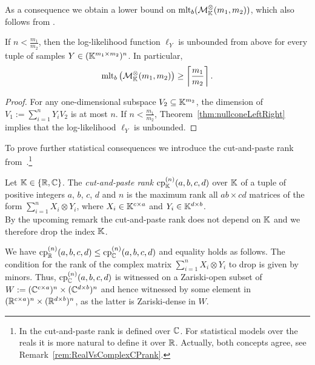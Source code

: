 As a consequence we obtain a lower bound on $\operatorname{mlt}_b ( \mathcal{M}^{\otimes}_{\mathbb{K}}(m_1,m_2) )$, which also follows from \cite[Lemma 1.2]{DrtonKurikiHoff}. 

\begin{cor}
	\label{cor:knownMLEbound}
	If $n < \frac{m_1}{m_2}$, then the log-likelihood function $\ell_Y$ is unbounded from above for every tuple of samples $Y \in (\mathbb K^{m_1 \times m_2})^n$.
	In particular,
		\[ \operatorname{mlt}_b \big( \mathcal{M}^{\otimes}_{\mathbb{K}}(m_1,m_2) \big) \geq \left\lceil \frac{m_1}{m_2} \right\rceil . \]
\end{cor}

\begin{proof}
	For any one-dimensional subspace $V_2 \subseteq \mathbb K^{m_2}$,
	the dimension of $V_1 := \sum_{i=1}^n Y_i V_2$ is at most $n$.
	If $n < \frac{m_1}{m_2}$, Theorem~\ref{thm:nullconeLeftRight} implies that the log-likelihood $\ell_Y$ is unbounded.
\end{proof}


To prove further statistical consequences we introduce the cut-and-paste rank from~\cite[Definition 2.2]{BurginDraisma}.\footnote{In \cite{BurginDraisma} the cut-and-paste rank is defined over $\mathbb C$. For statistical models over the reals it is more natural to define it over $\mathbb R$. Actually, both concepts agree, see Remark~\ref{rem:RealVsComplexCPrank}.}

\begin{defn}
	\label{def:cprank}
	Let $\mathbb K \in \{\mathbb R, \mathbb C\}$.
	The \emph{cut-and-paste rank} $\operatorname{cp}^{(n)}_{\mathbb K}(a,b,c,d)$ over $\mathbb K$ of a tuple of positive integers $a$, $b$, $c$, $d$ and $n$ is the maximum rank all $ab \times cd$ matrices of the form $\sum_{i = 1}^n X_i \otimes Y_i$, where $X_i \in \mathbb K^{c \times a}$ and $Y_i \in \mathbb K^{d \times b}$.\\
	By the upcoming remark the cut-and-paste rank does not depend on $\mathbb K$ and we therefore drop the index $\mathbb K$.
	\hfill{}
\end{defn}

\begin{remark}\label{rem:RealVsComplexCPrank}
	We have $\operatorname{cp}^{(n)}_{\mathbb R}(a,b,c,d) \leq \operatorname{cp}^{(n)}_{\mathbb C}(a,b,c,d)$
	and equality holds as follows. The condition for the rank of the complex matrix $\sum_{i = 1}^n X_i \otimes Y_i$ to drop is given by minors. Thus, $\operatorname{cp}^{(n)}_{\mathbb C}(a,b,c,d)$ is witnessed on a Zariski-open subset of $W := (\mathbb C^{c\times a})^n \times (\mathbb C^{d\times b})^n$ and hence witnessed by some element in $(\mathbb R^{c\times a})^n \times (\mathbb R^{d\times b})^n$, as the latter is Zariski-dense in $W$.
	\hfill\remSymbol
\end{remark}

